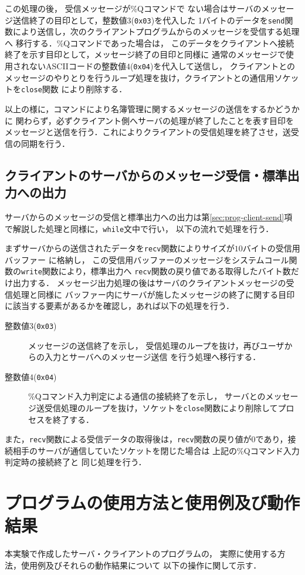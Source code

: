 この処理の後，
受信メッセージが\%Qコマンドで
ない場合はサーバのメッセージ送信終了の目印として，整数値3(\verb|0x03|)を代入した
1バイトのデータを\verb|send|関数により送信し，次のクライアントプログラムからのメッセージを受信する処理へ
移行する．\%Qコマンドであった場合は，
このデータをクライアントへ接続終了を示す目印として，メッセージ終了の目印と同様に
通常のメッセージで使用されないASCIIコードの整数値$4$(\verb|0x04|)を代入して送信し，
クライアントとのメッセージのやりとりを行うループ処理を抜け，クライアントとの通信用ソケットを\verb|close|関数
により削除する．

以上の様に，コマンドにより名簿管理に関するメッセージの送信をするかどうかに
関わらず，必ずクライアント側へサーバの処理が終了したことを表す目印を
メッセージと送信を行う．これによりクライアントの受信処理を終了させ，送受信の同期を行う．

\subsection{クライアントのサーバからのメッセージ受信・標準出力への出力}
サーバからのメッセージの受信と標準出力への出力は第\ref{sec:prog-client-send}項
で解説した処理と同様に，\verb|while|文中で行い，
以下の流れで処理を行う．

まずサーバからの送信されたデータを\verb|recv|関数によりサイズが$10$バイトの受信用バッファー
に格納し，
この受信用バッファーのメッセージをシステムコール関数の\verb|write|関数により，標準出力へ
\verb|recv|関数の戻り値である取得したバイト数だけ出力する．
メッセージ出力処理の後はサーバのクライアントメッセージの受信処理と同様に
バッファー内にサーバが施したメッセージの終了に関する目印に該当する要素があるかを確認し，あれば以下の処理を行う．
\begin{description}
  \item[整数値$3$(\texttt{0x03})] メッセージの送信終了を示し，
  受信処理のループを抜け，再びユーザからの入力とサーバへのメッセージ送信
  を行う処理へ移行する．
  \item[整数値$4$(\texttt{0x04})] \%Qコマンド入力判定による通信の接続終了を示し，
  サーバとのメッセージ送受信処理のループを抜け，ソケットを\verb|close|関数により削除してプロセスを終了する．
\end{description}
また，\verb|recv|関数による受信データの取得後は，\verb|recv|関数の戻り値が$0$であり，接続相手のサーバが通信していたソケットを閉じた場合は
上記の\%Qコマンド入力判定時の接続終了と
同じ処理を行う．

\section{プログラムの使用方法と使用例及び動作結果}
本実験で作成したサーバ・クライアントのプログラムの，
実際に使用する方法，使用例及びそれらの動作結果について
以下の操作に関して示す．

